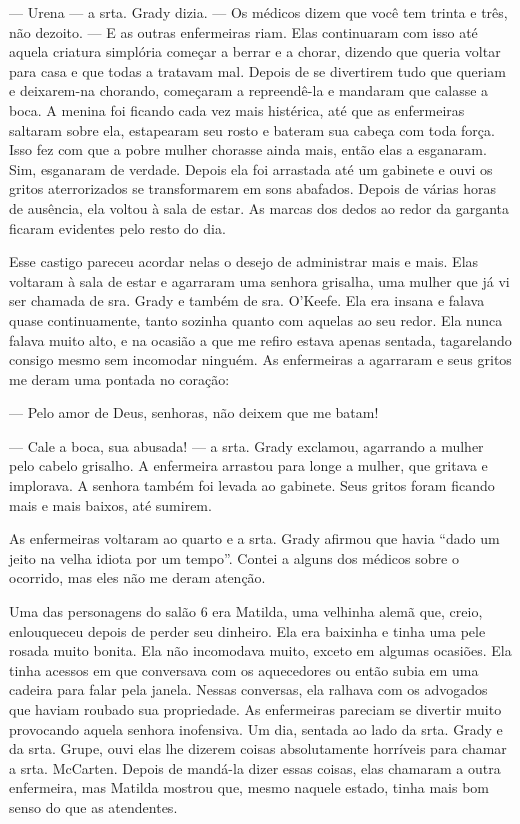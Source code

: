 --- Urena --- a srta. Grady dizia. --- Os médicos dizem que você tem
trinta e três, não dezoito. --- E as outras enfermeiras riam. Elas
continuaram com isso até aquela criatura simplória começar a berrar e a
chorar, dizendo que queria voltar para casa e que todas a tratavam mal.
Depois de se divertirem tudo que queriam e deixarem-na chorando,
começaram a repreendê-la e mandaram que calasse a boca. A menina foi
ficando cada vez mais histérica, até que as enfermeiras saltaram sobre
ela, estapearam seu rosto e bateram sua cabeça com toda força. Isso fez
com que a pobre mulher chorasse ainda mais, então elas a esganaram. Sim,
esganaram de verdade. Depois ela foi arrastada até um gabinete e ouvi os
gritos aterrorizados se transformarem em sons abafados. Depois de várias
horas de ausência, ela voltou à sala de estar. As marcas dos dedos ao
redor da garganta ficaram evidentes pelo resto do dia.

Esse castigo pareceu acordar nelas o desejo de administrar mais e mais.
Elas voltaram à sala de estar e agarraram uma senhora grisalha, uma
mulher que já vi ser chamada de sra. Grady e também de sra. O'Keefe. Ela era insana
e falava quase continuamente, tanto sozinha quanto com aquelas ao seu
redor. Ela nunca falava muito alto, e na ocasião a que me refiro estava
apenas sentada, tagarelando consigo mesmo sem incomodar ninguém. As
enfermeiras a agarraram e seus gritos me deram uma pontada no coração:

--- Pelo amor de Deus, senhoras, não deixem que me batam!

--- Cale a boca, sua abusada! --- a srta. Grady exclamou, agarrando a
mulher pelo cabelo grisalho. A enfermeira arrastou para longe a mulher, 
que gritava e implorava. A senhora também foi levada ao gabinete.
Seus gritos foram ficando mais e mais baixos, até sumirem.

As enfermeiras voltaram ao quarto e a srta. Grady afirmou que havia
``dado um jeito na velha idiota por um tempo''. Contei a alguns dos
médicos sobre o ocorrido, mas eles não me deram atenção.

Uma das personagens do salão 6 era Matilda, uma velhinha alemã que,
creio, enlouqueceu depois de perder seu dinheiro. Ela era baixinha e
tinha uma pele rosada muito bonita. Ela não incomodava muito, exceto em
algumas ocasiões. Ela tinha acessos em que conversava com os aquecedores
ou então subia em uma cadeira para falar pela janela. Nessas conversas,
ela ralhava com os advogados que haviam roubado sua propriedade. As
enfermeiras pareciam se divertir muito provocando aquela senhora
inofensiva. Um dia, sentada ao lado da srta. Grady e da srta. Grupe,
ouvi elas lhe dizerem coisas absolutamente horríveis para chamar a srta.
McCarten. Depois de mandá-la dizer essas coisas, elas chamaram a outra
enfermeira, mas Matilda mostrou que, mesmo naquele estado, tinha mais
bom senso do que as atendentes.

